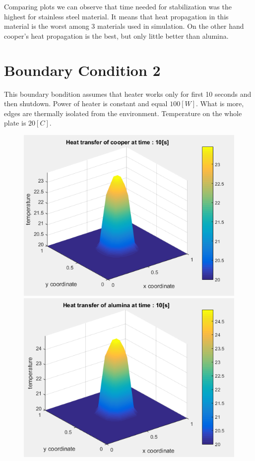 \documentclass[a4paper,12pt]{article}
\begin{document}
Comparing plots we can  observe that time needed for stabilization was the highest for stainless steel material. It means that heat propagation in this material is the worst among 3 materials used in simulation. On the other hand cooper's heat propagation is the best, but only little better than alumina.
\section{Boundary Condition 2}
This boundary bondition assumes that heater works only for first 10 seconds and then shutdown. Power of heater is constant and equal $100[W]$. What is more, edges are thermally isolated from the environment. Temperature on the whole plate is $20[C]$.

\begin{figure}[H]
\includegraphics[scale=0.55]{2_cooper_heater_stop}
\includegraphics[scale=0.55]{2_alumina_heater_stop}

\end{figure}
\end{document}
